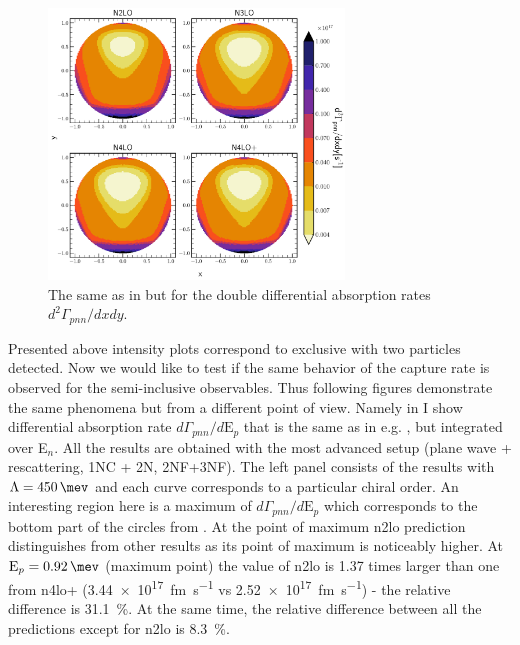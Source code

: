     \begin{figure}[h]
        \begin{center}
        \includegraphics[width=0.7\textwidth]{PlotData/PION/Dalitz_maps/figures/Dalitz_map_pnn_xy_orders.pdf}
        \end{center}
        \caption{The same as in  but for the double differential absorption rates
        $d^2 \Gamma_{pnn}/dxdy$.}
        \label{pion_map_xy_order}
    \end{figure}

    
    Presented above intensity plots correspond to exclusive  with two particles detected.
    Now we would like to test if the same behavior of the capture rate is observed for
    the semi-inclusive observables.
    Thus following figures demonstrate the same phenomena but from a different point of view.
    Namely in  I show differential absorption rate $d\Gamma_{pnn} /d\text{E}_p$
    that is the same as in e.g. , but integrated over E$_n$.
    All the results are obtained with the most advanced setup (plane wave + rescattering, 1NC + 2N, 2NF+3NF).
    The left panel consists of the results with $\Lambda=\SI{450}{\mev}$ and each curve corresponds 
    to a particular chiral order. An interesting region here is a maximum
    of $d\Gamma_{pnn} /d\text{E}_p$  which corresponds
    to the bottom part of the circles from . At the point of maximum
    \gls{n2lo} prediction distinguishes from other results as its point of maximum is noticeably higher.
    At $\text{E}_p = \SI{0.92}{\mev}$ (maximum point) the value of \gls{n2lo} is
    \num{1.37} times larger than one from \gls{n4lo+} (\SI{3.44e+17}{fm.\s^{-1}}
    vs \SI{2.52e+17}{fm.\s^{-1}}) - the relative difference is \SI{31.1}{\percent}.
    At the same time, the relative difference between all the predictions except for \gls{n2lo}
    is \SI{8.3}{\percent}.

